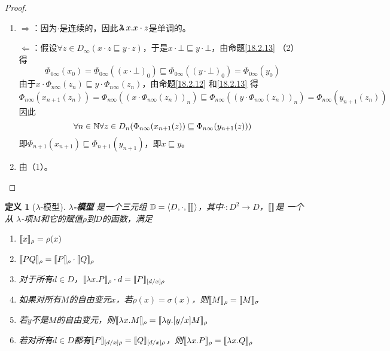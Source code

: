 \documentclass[11pt]{article}
\newtheorem{definition}[theorem]{定义}
\begin{document}
\begin{proof}
\begin{enumerate}
\item \(\Rightarrow\)：因为\(\cdot\)是连续的，因此\(\metalambda x.x\cdot z\)是单调的。

\(\Leftarrow\)：假设\(\forall z\in D_\infty(x\cdot z\sqsubseteq y\cdot z)\)，于是\(x\cdot\bot\sqsubseteq y\cdot\bot\)，由命题\ref{18.2.13} （2）得
\begin{equation*}
\Phi_{0\infty}(x_0)=\Phi_{0\infty}((x\cdot\bot)_0)\sqsubseteq\Phi_{0\infty}((y\cdot\bot)_0)=\Phi_{0\infty}(y_0)
\end{equation*}
由于\(x\cdot\Phi_{n\infty}(z_n)\sqsubseteq y\cdot\Phi_{n\infty}(z_n)\)，由命题\ref{18.2.12} 和\ref{18.2.13} 得
\begin{equation*}
\Phi_{n\infty}(x_{n+1}(z_n))=\Phi_{n\infty}((x\cdot\Phi_{n\infty}(z_n))_n)
\sqsubseteq\Phi_{n\infty}((y\cdot\Phi_{n\infty}(z_n))_n)=\Phi_{n\infty}(y_{n+1}(z_n))
\end{equation*}
因此
\begin{equation*}
\forall n\in\mathbb{N}\forall z\in D_n(\Phi_{n\infty}(x_{n+1}(z))\sqsubseteq\Phi_{n\infty}(y_{n+1}(z)))
\end{equation*}
即\(\Phi_{n+1}(x_{n+1})\sqsubseteq\Phi_{n+1}(y_{n+1})\)，即\(x\sqsubseteq y\)。
\item 由（1）。
\end{enumerate}
\end{proof}

\begin{definition}[\(\lambda\)-模型]
\textbf{\(\lambda\)-模型} 是一个三元组 \(\mathbb{D}=\langle D,\cdot,\llbracket  \rrbracket\rangle\)，其中\(\cdot:D^2\to D\)，\(\llbracket  \rrbracket\)是
 一个从 \(\lambda\)-项\(M\)和它的赋值\(\rho\)到\(D\)的函数，满足
\begin{enumerate}
\item \(\llbracket x \rrbracket_\rho=\rho(x)\)
\item \(\llbracket PQ \rrbracket_{\rho}=\llbracket P \rrbracket_\rho\cdot\llbracket Q \rrbracket_\rho\)
\item 对于所有\(d\in D\)，\(\llbracket \lambda x.P \rrbracket_\rho\cdot d=\llbracket P \rrbracket_{[d/x]\rho}\)
\item 如果对所有\(M\)的自由变元\(x\)，若\(\rho(x)=\sigma(x)\)，则\(\llbracket M \rrbracket_\rho=\llbracket M \rrbracket_\sigma\)
\item 若\(y\)不是\(M\)的自由变元，则\(\llbracket \lambda x.M \rrbracket_\rho=\llbracket \lambda y.[y/x]M \rrbracket_\rho\)
\item 若对所有\(d\in D\)都有\(\llbracket P \rrbracket_{[d/x]\rho}=\llbracket Q \rrbracket_{[d/x]\rho}\)，则\(\llbracket \lambda x.P \rrbracket_\rho=\llbracket \lambda x.Q \rrbracket_\rho\)
\end{enumerate}
\end{definition}
\end{document}
